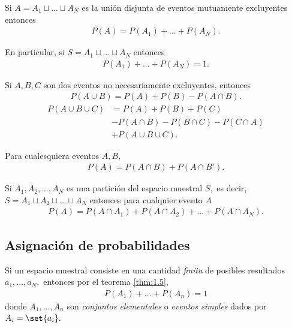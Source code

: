 {}
\begin{thm}
 \label{thm:0.1.5} Si $A=A_{1}\sqcup...\sqcup A_{N}$ es la unión disjunta de eventos mutuamente excluyentes entonces
 \begin{align}
 \label{eq:0.1.8}
P(A)=P(A_{1})+...+P(A_{N}).
\end{align}


En particular, si $S=A_{1}\sqcup...\sqcup A_{N}$ entonces
 \begin{align}
 \label{eq:0.1.9}
P(A_{1})+...+P(A_{N})=1.
\end{align}
\end{thm}


{}
\begin{thm}
 \label{thm:0.1.6}
  Si $A,B,C$ son dos eventos no necesariamente excluyentes, entonces
 \begin{align}
   \label{eq:0.1.10}
   P(A\cup B)=P(A)+P(B)-P(A\cap B).
 \end{align}
 \begin{align}
 \label{eq:0.1.11}
	P(A\cup B \cup C)&=P(A)+P(B)+P(C)\\
	&-P(A\cap B)-P(B\cap C)-P(C\cap A)\\
	&+P(A\cup B \cup C).
\end{align}
\end{thm}



{}
\begin{thm}
\label{thm:0.1.7}
 Para cualesquiera eventos $A,B,$
\begin{align}
 \label{eq:0.1.12}
 P(A)=P(A\cap B)+P(A\cap B').
\end{align}
\end{thm}


{}
\begin{thm}
 \label{thm:0.1.8}
 Si $A_{1},A_{2},..., A_{N}$ es una partición del espacio muestral $S,$ es decir,
 $S=A_{1} \sqcup A_{2} \sqcup ... \sqcup A_{N}$ entonces para cualquier evento $A$
 \begin{align}
  \label{eq:0.1.13}
  P(A)=P(A\cap A_{1})+ P(A\cap A_{2}) + ... +P(A\cap A_{N}).
 \end{align}
\end{thm}


\subsection{Asignación de probabilidades}
 {}
 Si un espacio muestral consiste en una cantidad \emph{finita} de posibles resultados $a_{1},...,a_{N},$ entonces por el teorema \ref{thm:1.5},
 \begin{align}
  \label{eq:0.1.14}
  P(A_{1})+...+P(A_{n})=1
 \end{align}
 donde $A_{1},...,A_{n}$ son \emph{conjuntos elementales} o \emph{eventos simples} dados por $A_{i}=\set{a_{i}}.$


